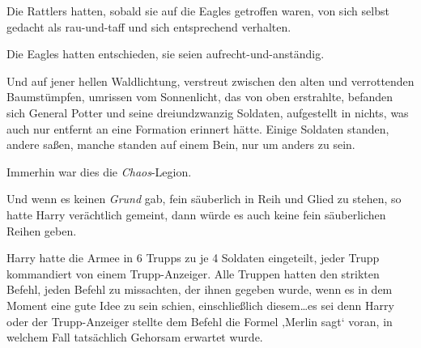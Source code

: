 Die Rattlers hatten, sobald sie auf die Eagles getroffen waren, von sich selbst gedacht als rau-und-taff und sich entsprechend verhalten.

Die Eagles hatten entschieden, sie seien aufrecht-und-anständig.

Und auf jener hellen Waldlichtung, verstreut zwischen den alten und verrottenden Baumstümpfen, umrissen vom Sonnenlicht, das von oben erstrahlte, befanden sich General Potter und seine dreiundzwanzig Soldaten, aufgestellt in nichts, was auch nur entfernt an eine Formation erinnert hätte. Einige Soldaten standen, andere saßen, manche standen auf einem Bein, nur um anders zu sein.

Immerhin war dies die \emph{Chaos}-Legion.

Und wenn es keinen \emph{Grund} gab, fein säuberlich in Reih und Glied zu stehen, so hatte Harry verächtlich gemeint, dann würde es auch keine fein säuberlichen Reihen geben.

Harry hatte die Armee in 6 Trupps zu je 4 Soldaten eingeteilt, jeder Trupp kommandiert von einem Trupp-Anzeiger. Alle Truppen hatten den strikten Befehl, jeden Befehl zu missachten, der ihnen gegeben wurde, wenn es in dem Moment eine gute Idee zu sein schien, einschließlich diesem…es sei denn Harry oder der Trupp-Anzeiger stellte dem Befehl die Formel ‚Merlin sagt‘ voran, in welchem Fall tatsächlich Gehorsam erwartet wurde.%

